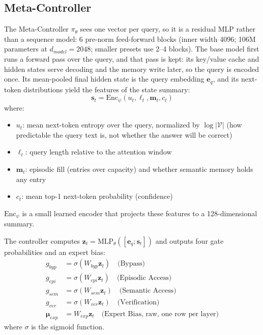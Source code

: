 \documentclass{article}
\begin{document}
\subsection{Meta-Controller}

The Meta-Controller $\pi_\theta$ sees one vector per query, so it is a residual MLP rather than a sequence model: 6 pre-norm feed-forward blocks (inner width 4096; 106M parameters at $d_{model}=2048$; smaller presets use 2--4 blocks). The base model first runs a forward pass over the query, and that pass is kept: its key/value cache and hidden states serve decoding and the memory write later, so the query is encoded once. Its mean-pooled final hidden state is the query embedding $\mathbf{e}_q$, and its next-token distributions yield the features of the state summary:
\begin{equation}
\mathbf{s}_t = \text{Enc}_\psi(u_t, \ell_t, \mathbf{m}_t, c_t)
\end{equation}
where:
\begin{itemize}
    \item $u_t$: mean next-token entropy over the query, normalized by $\log|\mathcal{V}|$ (how predictable the query text is, not whether the answer will be correct)
    \item $\ell_t$: query length relative to the attention window
    \item $\mathbf{m}_t$: episodic fill (entries over capacity) and whether semantic memory holds any entry
    \item $c_t$: mean top-1 next-token probability (confidence)
\end{itemize}
$\text{Enc}_\psi$ is a small learned encoder that projects these features to a 128-dimensional summary.

The controller computes $\mathbf{z}_t = \text{MLP}_\theta([\mathbf{e}_q; \mathbf{s}_t])$ and outputs four gate probabilities and an expert bias:
\begin{align}
g_{byp} &= \sigma(W_{byp} \mathbf{z}_t) \quad \text{(Bypass)} \\
g_{epi} &= \sigma(W_{epi} \mathbf{z}_t) \quad \text{(Episodic Access)} \\
g_{sem} &= \sigma(W_{sem} \mathbf{z}_t) \quad \text{(Semantic Access)} \\
g_{ver} &= \sigma(W_{ver} \mathbf{z}_t) \quad \text{(Verification)} \\
\boldsymbol{\mu}_{exp} &= W_{exp} \mathbf{z}_t \quad \text{(Expert Bias, raw, one row per layer)}
\end{align}
where $\sigma$ is the sigmoid function.
\end{document}
